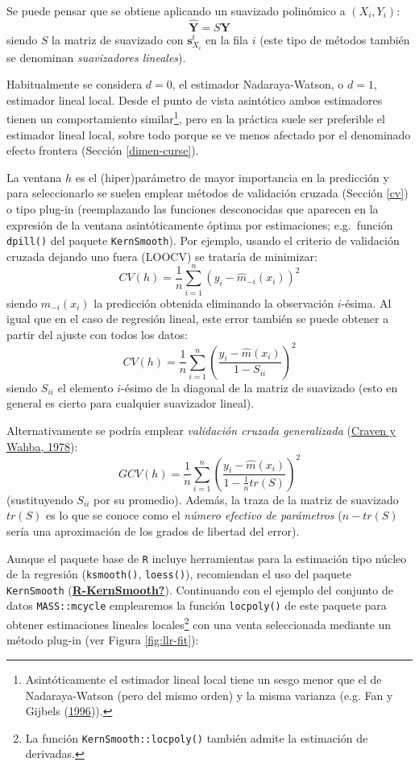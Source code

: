 \documentclass[
]{book}
\theoremstyle{break}
\theoremstyle{nonumberplain}
\begin{document}
Se puede pensar que se obtiene aplicando un suavizado polinómico a
\((X_i, Y_i)\):
\[\hat{\mathbf{Y}} = S\mathbf{Y}\]
siendo \(S\) la matriz de suavizado con \(\mathbf{s}_{X_{i}}^{t}\) en la fila \(i\) (este tipo de métodos también se denominan \emph{suavizadores lineales}).

Habitualmente se considera \(d=0\), el estimador Nadaraya-Watson, o \(d=1\), estimador lineal local.
Desde el punto de vista asintótico ambos estimadores tienen un comportamiento similar\footnote{Asintóticamente el estimador lineal local tiene un sesgo menor que el de Nadaraya-Watson (pero del mismo orden) y la misma varianza (e.g. Fan y Gijbels (\protect\hyperlink{ref-fan1996}{1996})).}, pero en la práctica suele ser preferible el estimador lineal local, sobre todo porque se ve menos afectado por el denominado efecto frontera (Sección \ref{dimen-curse}).

La ventana \(h\) es el (hiper)parámetro de mayor importancia en la predicción y para seleccionarlo se suelen emplear métodos de validación cruzada (Sección \ref{cv}) o tipo plug-in (reemplazando las funciones desconocidas que aparecen en la expresión de la ventana asintóticamente óptima por estimaciones; e.g.~función \texttt{dpill()} del paquete \texttt{KernSmooth}).
Por ejemplo, usando el criterio de validación cruzada dejando uno fuera (LOOCV) se trataría de minimizar:
\[CV(h)=\frac{1}{n}\sum_{i=1}^n(y_i-\hat{m}_{-i}(x_i))^2\]
siendo \(\hat{m}_{-i}(x_i)\) la predicción obtenida eliminando la observación \(i\)-ésima.
Al igual que en el caso de regresión lineal, este error también se puede obtener a partir del ajuste con todos los datos:
\[CV(h)=\frac{1}{n}\sum_{i=1}^n\left(\frac{y_i-\hat{m}(x_i)}{1 - S_{ii}}\right)^2\]
siendo \(S_{ii}\) el elemento \(i\)-ésimo de la diagonal de la matriz de suavizado (esto en general es cierto para cualquier suavizador lineal).

Alternativamente se podría emplear \emph{validación cruzada generalizada} (\protect\hyperlink{ref-craven1978smoothing}{Craven y Wahba, 1978}):
\[GCV(h)=\frac{1}{n}\sum_{i=1}^n\left(\frac{y_i-\hat{m}(x_i)}{1 - \frac{1}{n}tr(S)}\right)^2\]
(sustituyendo \(S_{ii}\) por su promedio).
Además, la traza de la matriz de suavizado \(tr(S)\) es lo que se conoce como el \emph{número efectivo de parámetros} (\(n - tr(S)\) sería una aproximación de los grados de libertad del error).

Aunque el paquete base de \texttt{R} incluye herramientas para la estimación tipo núcleo de la regresión (\texttt{ksmooth()}, \texttt{loess()}), recomiendan el uso del paquete \texttt{KernSmooth} (\protect\hyperlink{ref-R-KernSmooth}{\textbf{R-KernSmooth?}}).
Continuando con el ejemplo del conjunto de datos \texttt{MASS::mcycle} emplearemos la función \texttt{locpoly()} de este paquete para obtener estimaciones lineales locales\footnote{La función \texttt{KernSmooth::locpoly()} también admite la estimación de derivadas.} con una venta seleccionada mediante un método plug-in (ver Figura \ref{fig:llr-fit}):
\end{document}
